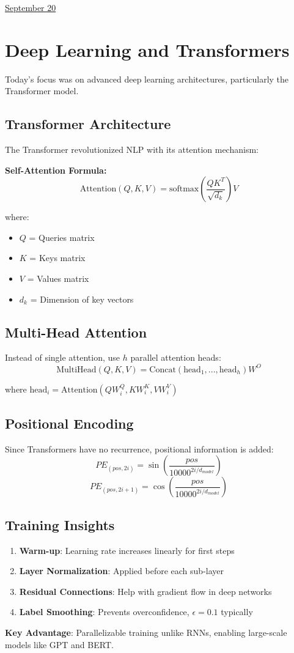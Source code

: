 \documentclass[11pt,letterpaper]{article}
\begin{document}
\href{run:2025-09-20-deep-learning.tex}{\Huge September 20} %

\section{Deep Learning and Transformers}

Today's focus was on advanced deep learning architectures, particularly the Transformer model.

\subsection{Transformer Architecture}
The Transformer \cite{example2025} revolutionized NLP with its attention mechanism:

\textbf{Self-Attention Formula:}
$$\text{Attention}(Q, K, V) = \text{softmax}\left(\frac{QK^T}{\sqrt{d_k}}\right)V$$

where:
\begin{itemize}
    \item $Q$ = Queries matrix
    \item $K$ = Keys matrix  
    \item $V$ = Values matrix
    \item $d_k$ = Dimension of key vectors
\end{itemize}

\subsection{Multi-Head Attention}
Instead of single attention, use $h$ parallel attention heads:
$$\text{MultiHead}(Q, K, V) = \text{Concat}(\text{head}_1, ..., \text{head}_h)W^O$$

where $\text{head}_i = \text{Attention}(QW_i^Q, KW_i^K, VW_i^V)$

\subsection{Positional Encoding}
Since Transformers have no recurrence, positional information is added:
$$PE_{(pos, 2i)} = \sin\left(\frac{pos}{10000^{2i/d_{model}}}\right)$$
$$PE_{(pos, 2i+1)} = \cos\left(\frac{pos}{10000^{2i/d_{model}}}\right)$$

\subsection{Training Insights}
\begin{enumerate}
    \item \textbf{Warm-up}: Learning rate increases linearly for first steps
    \item \textbf{Layer Normalization}: Applied before each sub-layer
    \item \textbf{Residual Connections}: Help with gradient flow in deep networks
    \item \textbf{Label Smoothing}: Prevents overconfidence, $\epsilon = 0.1$ typically
\end{enumerate}

\textbf{Key Advantage}: Parallelizable training unlike RNNs, enabling large-scale models like GPT and BERT.

 
\end{document}
